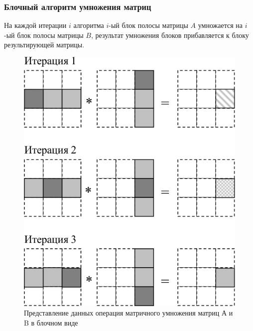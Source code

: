 \documentclass{beamer}
\begin{document}
\begin{frame}
\frametitle{Блочный алгоритм умножения матриц}
На каждой итерации $i$ алгоритма $i$-ый блок полосы матрицы $A$ умножается на $i$-ый блок полосы матрицы $B$, результат умножения блоков прибавляется к блоку результирующей матрицы.

\begin{figure}
\includegraphics[scale=0.28]{res/pic012}
\caption{Представление данных операция матричного умножения матриц А и B в блочном виде}
\end{figure}

\end{frame}

\end{document}
